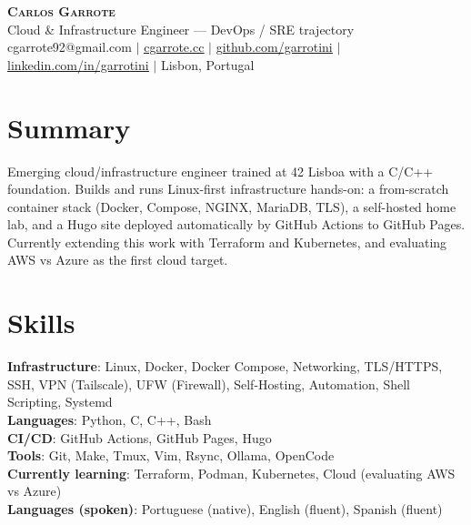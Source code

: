 \documentclass[a4paper,10pt]{article}
\begin{document}
\begin{center}
    \textbf{\Huge \scshape Carlos Garrote} \\ \vspace{2pt}
    \small Cloud \& Infrastructure Engineer --- DevOps / SRE trajectory \\ \vspace{1pt}
    \small cgarrote92@gmail.com $|$ \href{https://cgarrote.cc}{\underline{cgarrote.cc}} $|$ \href{https://github.com/garrotini}{\underline{github.com/garrotini}} $|$
    \href{https://linkedin.com/in/garrotini}{\underline{linkedin.com/in/garrotini}} $|$ Lisbon, Portugal
\end{center}

\section{Summary}
  \small{
    Emerging cloud/infrastructure engineer trained at 42 Lisboa with a C/C++ foundation.
    Builds and runs Linux-first infrastructure hands-on: a from-scratch container stack
    (Docker, Compose, NGINX, MariaDB, TLS), a self-hosted home lab, and a Hugo site deployed
    automatically by GitHub Actions to GitHub Pages. Currently extending this work with
    Terraform and Kubernetes, and evaluating AWS vs Azure as the first cloud target.
  }

\section{Skills}
 \begin{itemize}[leftmargin=0.15in, label={}]
    \small{\item{
     \textbf{Infrastructure}{: Linux, Docker, Docker Compose, Networking, TLS/HTTPS, SSH, VPN (Tailscale), UFW (Firewall), Self-Hosting, Automation, Shell Scripting, Systemd} \\
     \textbf{Languages}{: Python, C, C++, Bash} \\
     \textbf{CI/CD}{: GitHub Actions, GitHub Pages, Hugo} \\
     \textbf{Tools}{: Git, Make, Tmux, Vim, Rsync, Ollama, OpenCode} \\
     \textbf{Currently learning}{: Terraform, Podman, Kubernetes, Cloud (evaluating AWS vs Azure)} \\
     \textbf{Languages (spoken)}{: Portuguese (native), English (fluent), Spanish (fluent)}
    }}
 \end{itemize}
\end{document}

